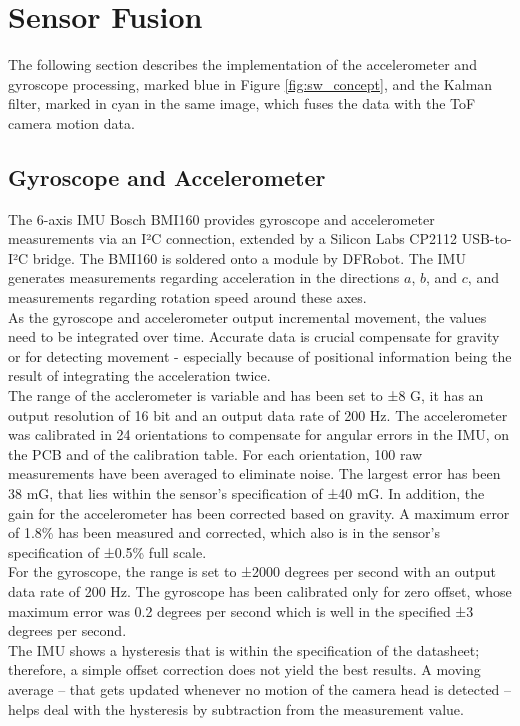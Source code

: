 \section{Sensor Fusion}
\label{sec:PositionEstimate}
The following section describes the implementation of the accelerometer and gyroscope processing, marked blue in Figure \ref{fig:sw_concept}, and the Kalman filter, marked in cyan in the same image, which fuses the data with the ToF camera motion data.

\subsection{Gyroscope and Accelerometer}
\label{sec:GyroCal}
The 6-axis IMU Bosch BMI160 provides gyroscope and accelerometer measurements via an I²C connection, extended by a Silicon Labs CP2112 USB-to-I²C bridge. The BMI160 is soldered onto a module by DFRobot. The IMU generates measurements regarding acceleration in the directions $a$, $b$, and $c$, and measurements regarding rotation speed around these axes.\\
As the gyroscope and accelerometer output incremental movement, the values need to be integrated over time. Accurate data is crucial compensate for gravity or for detecting movement - especially because of positional information being the result of integrating the acceleration twice.\\
The range of the acclerometer is variable and has been set to ±8 G, it has an output resolution of 16 bit and an output data rate of 200 Hz.
The accelerometer was calibrated in 24 orientations to compensate for angular errors in the IMU, on the PCB and of the calibration table. For each orientation, 100 raw measurements have been averaged to eliminate noise. 
The largest error has been 38 mG, that lies within the sensor's specification of ±40 mG\cite{BMI160}. In addition, the gain for the accelerometer has been corrected based on gravity. A maximum error of 1.8\% has been measured and corrected, which also is in the sensor's specification of ±0.5\% full scale\cite{BMI160}.\\
For the gyroscope, the range is set to ±2000 degrees per second with an output data rate of 200 Hz. The gyroscope has been calibrated only for zero offset, whose maximum error was 0.2 degrees per second which is well in the specified ±3 degrees per second\cite{BMI160}.\\
The IMU shows a hysteresis that is within the specification of the datasheet; therefore, a simple offset correction does not yield the best results. A moving average – that gets updated whenever no motion of the camera head is detected – helps deal with the hysteresis by subtraction from the measurement value.

